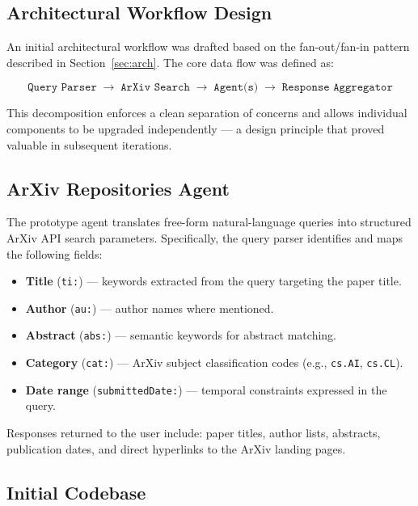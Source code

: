 \documentclass[12pt, a4paper]{article}
\begin{document}
\subsection{Architectural Workflow Design}

An initial architectural workflow was drafted based on the fan-out/fan-in
pattern described in Section~\ref{sec:arch}. The core data flow was
defined as:

\[
  \texttt{Query Parser} \;\longrightarrow\; \texttt{ArXiv Search}
  \;\longrightarrow\; \texttt{Agent(s)}
  \;\longrightarrow\; \texttt{Response Aggregator}
\]

This decomposition enforces a clean separation of concerns and allows
individual components to be upgraded independently --- a design principle
that proved valuable in subsequent iterations.

\subsection{ArXiv Repositories Agent}

The prototype agent translates free-form natural-language queries into
structured ArXiv API search parameters. Specifically, the query parser
identifies and maps the following fields:

\begin{itemize}[leftmargin=*]
    \item \textbf{Title} (\texttt{ti:}) --- keywords extracted from the
          query targeting the paper title.
    \item \textbf{Author} (\texttt{au:}) --- author names where mentioned.
    \item \textbf{Abstract} (\texttt{abs:}) --- semantic keywords for
          abstract matching.
    \item \textbf{Category} (\texttt{cat:}) --- ArXiv subject classification
          codes (e.g., \texttt{cs.AI}, \texttt{cs.CL}).
    \item \textbf{Date range} (\texttt{submittedDate:}) --- temporal
          constraints expressed in the query.
\end{itemize}

Responses returned to the user include: paper titles, author lists,
abstracts, publication dates, and direct hyperlinks to the ArXiv landing
pages.

\subsection{Initial Codebase}
\end{document}

